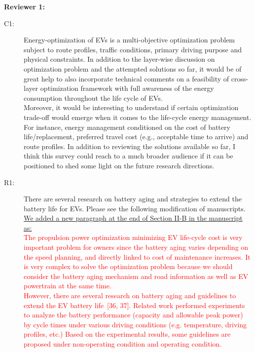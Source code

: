 \documentclass[onecolumn]{IEEEconf}
\begin{document}
\setlength{\parindent}{0cm}
\textbf{Reviewer 1:}
\begin{description}
\item [C1: ] Energy-optimization of EVs is a multi-objective optimization problem subject to route profiles, traffic conditions, primary driving purpose and physical constraints. In addition to the layer-wise discussion on optimization problem and the attempted solutions so far, it would be of great help to also incorporate technical comments on a feasibility of cross-layer optimization framework with full awareness of the energy consumption throughout the life cycle of EVs.\\ 
Moreover, it would be interesting to understand if certain optimization trade-off would emerge when it comes to the life-cycle energy management. For instance, energy management conditioned on the cost of battery life/replacement, preferred travel cost (e.g., acceptable time to arrive) and route profiles. In addition to reviewing  the solutions available so far, I think this survey could reach to a much broader audience if it can be positioned to shed some light on the future research directions.
\item [R1: ] There are several research on battery aging and strategies to extend the battery life for EVs.  Please see the following modification of manuscripts.\\

\underline{We added a new paragraph at the end of Section II-B in the manuscript as:}\\
\textcolor{red}{
The propulsion power optimization minimizing EV life-cycle cost is very important problem for owners since the battery aging varies depending on the speed planning, and directly linked to cost of maintenance increases.
It is very complex to solve the optimization problem because we should consider the battery aging mechanism and road information as well as EV powertrain at the same time.\\
%
However, there are several research on battery aging and guidelines to extend the EV battery life~[36, 37]. Related work performed experiments to analyze the battery performance (capacity and allowable peak power) by cycle times under various driving conditions (e.g. temperature, driving profiles, etc.) Based on the experimental results, some guidelines are proposed under non-operating condition and operating condition.}
~\\

\end{description}
\end{document}
